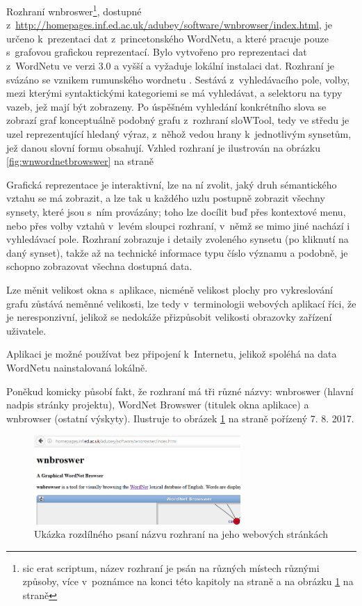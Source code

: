 \documentclass[a4paper,11pt,openany,twoside]{book}
\begin{document}
					Rozhraní wnbroswer\footnote{sic erat scriptum, název rozhraní je psán na různých místech různými způsoby, více v~poznámce na konci této kapitoly na straně \pageref{note:wnbroswer} a na obrázku \ref{fig:wnbroswerbadwriting} na straně \pageref{fig:wnbroswerbadwriting}}, dostupné z~\url{http://homepages.inf.ed.ac.uk/adubey/software/wnbrowser/index.html}, je určeno k~prezentaci dat z~princetonského WordNetu, a které pracuje pouze s~grafovou grafickou reprezentací. Bylo vytvořeno pro reprezentaci dat z~WordNetu ve verzi 3.0 a vyšší a vyžaduje lokální instalaci dat. Rozhraní je svázáno se vznikem rumunského wordnetu \parencite{fivser2011visualizing}. Sestává z~vyhledávacího pole, volby, mezi kterými syntaktickými kategoriemi se má vyhledávat, a selektoru na typy vazeb, jež mají být zobrazeny. Po úspěšném vyhledání konkrétního slova se zobrazí graf konceptuálně podobný grafu z~rozhraní sloWTool, tedy ve středu je uzel reprezentující hledaný výraz, z~něhož vedou hrany k~jednotlivým synsetům, jež danou slovní formu obsahují. Vzhled rozhraní je ilustrován na obrázku \ref{fig:wnwordnetbrowswer} na straně \pageref{fig:wnwordnetbrowswer}

					Grafická reprezentace je interaktivní, lze na ní zvolit, jaký druh sémantického vztahu se má zobrazit, a lze tak u každého uzlu postupně zobrazit všechny synsety, které jsou s~ním provázány; toho lze docílit buď přes kontextové menu, nebo přes volby vztahů v~levém sloupci rozhraní, v~němž se mimo jiné nachází i vyhledávací pole. Rozhraní zobrazuje i detaily zvoleného synsetu (po kliknutí na daný synset), takže až na technické informace typu číslo významu a podobně, je schopno zobrazovat všechna dostupná data.

					Lze měnit velikost okna s~aplikace, nicméně velikost plochy pro vykreslování grafu zůstává neměnné velikosti, lze tedy v~terminologii webových aplikací říci, že je neresponzivní, jelikož se nedokáže přizpůsobit velikosti obrazovky zařízení uživatele.

					Aplikaci je možné používat bez připojení k~Internetu, jelikož spoléhá na data WordNetu nainstalovaná lokálně. 

					\label{note:wnbroswer} Poněkud komicky působí fakt, že rozhraní má tři různé názvy: wnbroswer (hlavní nadpis stránky projektu), WordNet Browswer (titulek okna aplikace) a wnbrowser (ostatní výskyty). Ilustruje to obrázek \ref{fig:wnbroswerbadwriting} na straně \pageref{fig:wnbroswerbadwriting} pořízený 7. 8. 2017.

					\begin{figure}[h]
						\centering
						\includegraphics[width=0.7\textwidth]{wnbroswer.png}
						\caption{Ukázka rozdílného psaní názvu rozhraní na jeho webových stránkách}
						\label{fig:wnbroswerbadwriting}
					\end{figure}
\end{document}
